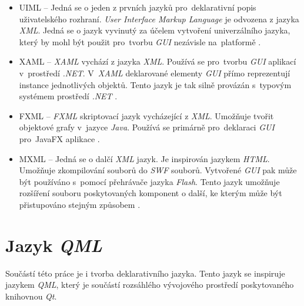 \documentclass[11pt,twoside,a4paper]{book}
\begin{document}
\begin{itemize}
\item UIML – Jedná se o jeden z prvních jazyků pro~deklarativní popis uživatelského rozhraní. \textit{User Interface Markup Language} je odvozena z jazyka \textit{XML}. Jedná se o jazyk vyvinutý za účelem vytvoření univerzálního jazyka, který by mohl být použit pro~tvorbu \textit{GUI} nezávisle na~platformě \cite{bib:UIML}.
\item XAML – \textit{XAML} vychází z jazyka \textit{XML}. Používá se pro~tvorbu \textit{GUI} aplikací v~prostředí \textit{.NET}. V~\textit{XAML} deklarované elementy \textit{GUI} přímo reprezentují instance jednotlivých objektů. Tento jazyk je tak silně provázán s~typovým systémem prostředí \textit{.NET}  \cite{bib:XAML}.
\item FXML – \textit{FXML} skriptovací jazyk vycházející z \textit{XML}. Umožňuje tvořit objektové grafy v~jazyce \textit{Java}. Používá se primárně pro~deklaraci \textit{GUI} pro~JavaFX aplikace \cite{bib:FXML}.
\item MXML – Jedná se o dalčí \textit{XML} jazyk. Je inspirován jazykem \textit{HTML}. Umožňuje zkompilování souborů do \textit{SWF} souborů. Vytvořené \textit{GUI} pak může být používáno s~pomocí přehrávače jazyka \textit{Flash}. Tento jazyk umožňuje rozšíření souboru poskytovaných komponent o další, ke kterým může být přistupováno stejným způsobem \cite{bib:MXML}.
\end{itemize}


\section{\label{SEC:QML}Jazyk \textit{QML}}
Součástí této práce je i tvorba deklarativního jazyka. Tento jazyk se inspiruje jazykem \textit{QML}, který je součástí rozsáhlého vývojového prostředí poskytovaného knihovnou \textit{Qt}.
\end{document}

